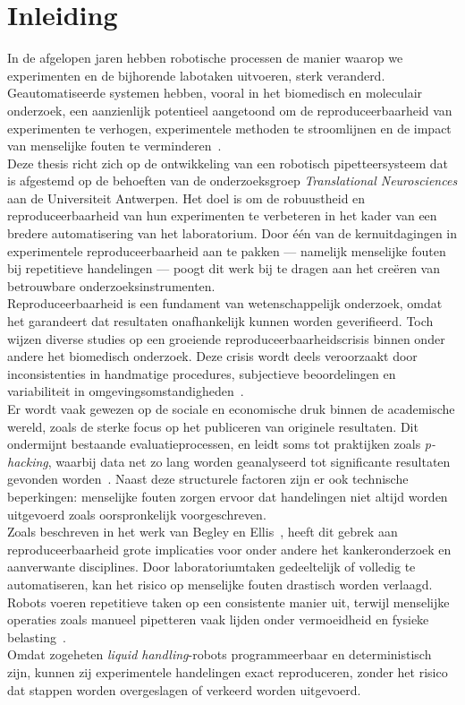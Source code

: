 \chapter{Inleiding}

In de afgelopen jaren hebben robotische processen de manier waarop we experimenten en de bijhorende labotaken uitvoeren, sterk veranderd. Geautomatiseerde systemen hebben, vooral in het biomedisch en moleculair onderzoek, een aanzienlijk potentieel aangetoond om de reproduceerbaarheid van experimenten te verhogen, experimentele methoden te stroomlijnen en de impact van menselijke fouten te verminderen\ \cite{RN5}.
\\[12pt]Deze thesis richt zich op de ontwikkeling van een robotisch pipetteersysteem dat is afgestemd op de behoeften van de onderzoeksgroep \textit{Translational Neurosciences} aan de Universiteit Antwerpen. Het doel is om de robuustheid en reproduceerbaarheid van hun experimenten te verbeteren in het kader van een bredere automatisering van het laboratorium. Door één van de kernuitdagingen in experimentele reproduceerbaarheid aan te pakken — namelijk menselijke fouten bij repetitieve handelingen — poogt dit werk bij te dragen aan het creëren van betrouwbare onderzoeksinstrumenten.
\\[12pt]Reproduceerbaarheid is een fundament van wetenschappelijk onderzoek, omdat het garandeert dat resultaten onafhankelijk kunnen worden geverifieerd. Toch wijzen diverse studies op een groeiende reproduceerbaarheidscrisis binnen onder andere het biomedisch onderzoek. Deze crisis wordt deels veroorzaakt door inconsistenties in handmatige procedures, subjectieve beoordelingen en variabiliteit in omgevingsomstandigheden\ \cite{RN2}. 
\\[12pt]Er wordt vaak gewezen op de sociale en economische druk binnen de academische wereld, zoals de sterke focus op het publiceren van originele resultaten. Dit ondermijnt bestaande evaluatieprocessen, en leidt soms tot praktijken zoals \textit{p-hacking}, waarbij data net zo lang worden geanalyseerd tot significante resultaten gevonden worden\ \cite{RN2,RN6}. Naast deze structurele factoren zijn er ook technische beperkingen: menselijke fouten zorgen ervoor dat handelingen niet altijd worden uitgevoerd zoals oorspronkelijk voorgeschreven.
\\[12pt]Zoals beschreven in het werk van Begley en Ellis\ \cite{RN4}, heeft dit gebrek aan reproduceerbaarheid grote implicaties voor onder andere het kankeronderzoek en aanverwante disciplines. Door laboratoriumtaken gedeeltelijk of volledig te automatiseren, kan het risico op menselijke fouten drastisch worden verlaagd. Robots voeren repetitieve taken op een consistente manier uit, terwijl menselijke operaties zoals manueel pipetteren vaak lijden onder vermoeidheid en fysieke belasting\ \cite{RN9}. 
\\[12pt]Omdat zogeheten \textit{liquid handling}-robots programmeerbaar en deterministisch zijn, kunnen zij experimentele handelingen exact reproduceren, zonder het risico dat stappen worden overgeslagen of verkeerd worden uitgevoerd.

